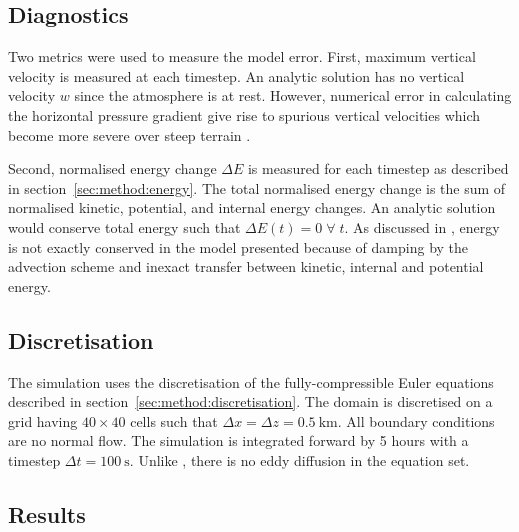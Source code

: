 \subsection{Diagnostics}
Two metrics were used to measure the model error.  First, maximum vertical velocity is measured at each timestep.  An analytic solution has no vertical velocity $w$ since the atmosphere is at rest.  However, numerical error in calculating the horizontal pressure gradient give rise to spurious vertical velocities which become more severe over steep terrain \autocite{klemp2011}.

Second, normalised energy change $\Delta E$ is measured for each timestep as described in section~\ref{sec:method:energy}.  The total normalised energy change is the sum of normalised kinetic, potential, and internal energy changes.
An analytic solution would conserve total energy such that $\Delta E(t) = 0\;\forall\;t$.  As discussed in \textcite{weller-shahrokhi2014}, energy is not exactly conserved in the model presented because of damping by the advection scheme and inexact transfer between kinetic, internal and potential energy.

\subsection{Discretisation}
The simulation uses the discretisation of the fully-compressible Euler equations described in section~\ref{sec:method:discretisation}.  The domain is discretised on a grid having $40 \times 40$ cells such that $\Delta x = \Delta z = \SI{0.5}{\kilo\meter}$.  All boundary conditions are no normal flow.  The simulation is integrated forward by 5 hours with a timestep $\Delta t = \SI{100}{\second}$.  Unlike \textcite{klemp2011}, there is no eddy diffusion in the equation set.

\subsection{Results}

